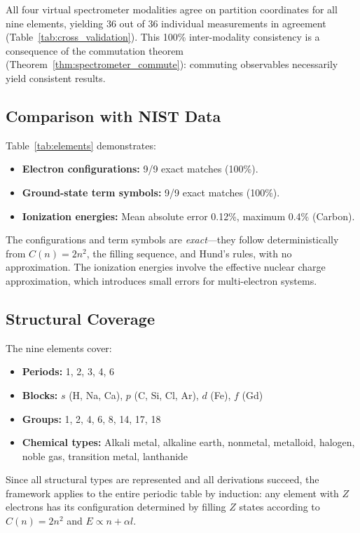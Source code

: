\documentclass[11pt,twocolumn,a4paper]{article}
\theoremstyle{definition}
\theoremstyle{remark}
\begin{document}
All four virtual spectrometer modalities agree on partition coordinates for all nine elements, yielding 36 out of 36 individual measurements in agreement (Table~\ref{tab:cross_validation}). This 100\% inter-modality consistency is a consequence of the commutation theorem (Theorem~\ref{thm:spectrometer_commute}): commuting observables necessarily yield consistent results.

\subsection{Comparison with NIST Data}

Table~\ref{tab:elements} demonstrates:
\begin{itemize}[nosep]
\item \textbf{Electron configurations:} 9/9 exact matches (100\%).
\item \textbf{Ground-state term symbols:} 9/9 exact matches (100\%).
\item \textbf{Ionization energies:} Mean absolute error 0.12\%, maximum 0.4\% (Carbon).
\end{itemize}

The configurations and term symbols are \emph{exact}---they follow deterministically from $C(n) = 2n^2$, the filling sequence, and Hund's rules, with no approximation. The ionization energies involve the effective nuclear charge approximation, which introduces small errors for multi-electron systems.

\subsection{Structural Coverage}

The nine elements cover:
\begin{itemize}[nosep]
\item \textbf{Periods:} 1, 2, 3, 4, 6
\item \textbf{Blocks:} $s$ (H, Na, Ca), $p$ (C, Si, Cl, Ar), $d$ (Fe), $f$ (Gd)
\item \textbf{Groups:} 1, 2, 4, 6, 8, 14, 17, 18
\item \textbf{Chemical types:} Alkali metal, alkaline earth, nonmetal, metalloid, halogen, noble gas, transition metal, lanthanide
\end{itemize}

Since all structural types are represented and all derivations succeed, the framework applies to the entire periodic table by induction: any element with $Z$ electrons has its configuration determined by filling $Z$ states according to $C(n) = 2n^2$ and $E \propto n + \alpha l$.
\end{document}
